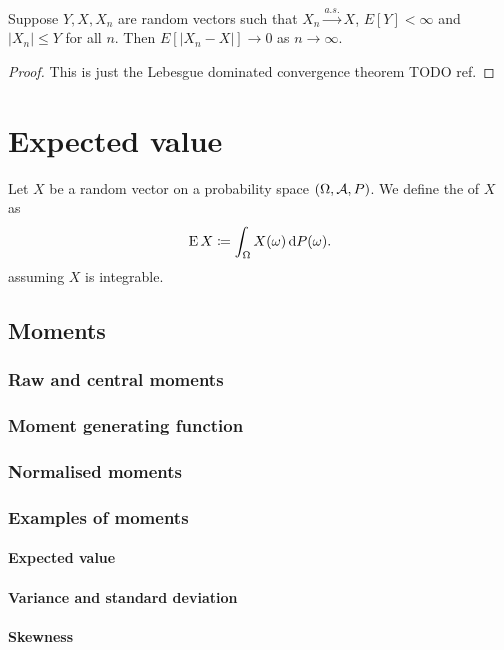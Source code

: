 \begin{lemma}
Suppose $Y,X,X_n$ are random vectors such that $X_n \overset{a.s.}{\longrightarrow} X$, $E[Y]<\infty$ and $|X_n| \leq Y$ for all $n$. Then $E[|X_n -X|] \to 0$ as $n\to \infty$.
\end{lemma}
\begin{proof}
This is just the Lebesgue dominated convergence theorem TODO ref.
\end{proof}

\section{Expected value}
\begin{definition}
Let $X$ be a random  vector on a probability space $\left( \Omega, \mathcal{A}, P \right)$. We define the  of $X$ as
\[ \operatorname{E}{X} \coloneqq \int_\Omega X(\omega)\operatorname{d \!}{P(\omega)}. \]
assuming $X$ is integrable.
\end{definition}



\subsection{Moments}
\subsubsection{Raw and central moments}
\subsubsection{Moment generating function}
\subsubsection{Normalised moments}
\subsubsection{Examples of moments}
\paragraph{Expected value}
\paragraph{Variance and standard deviation}
\paragraph{Skewness}
